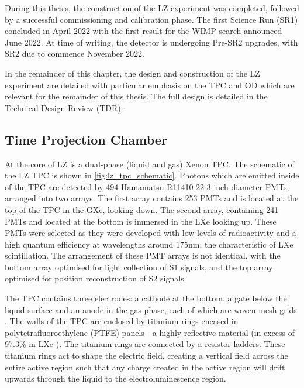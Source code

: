 \par
During this thesis, the construction of the LZ experiment was completed, followed by a successful commissioning and calibration phase.
The first Science Run (SR1) concluded in April 2022 with the first result for the WIMP search announced June 2022.
At time of writing, the detector is undergoing Pre-SR2 upgrades, with SR2 due to commence November 2022.

\par
In the remainder of this chapter, the design and construction of the LZ experiment are detailed with particular emphasis on the TPC and OD which are relevant for the remainder of this thesis. 
The full design is detailed in the Technical Design Review (TDR) \cite{LZ_TechnicalDesignReview_ref}.

\subsection{Time Projection Chamber}
\label{sec:lz_tpc}
\par
At the core of LZ is a dual-phase (liquid and gas) Xenon TPC.
The schematic of the LZ TPC is shown in \autoref{fig:lz_tpc_schematic}.
Photons which are emitted inside of the TPC are detected by 494 Hamamatsu R11410-22 3-inch diameter PMTs, arranged into two arrays.
The first array contains 253 PMTs and is located at the top of the TPC in the GXe, looking down.
The second array, containing 241 PMTs and located at the bottom is immersed in the LXe looking up.
These PMTs were selected as they were developed with low levels of radioactivity and a high quantum efficiency at wavelengths around 175nm, the characteristic of LXe scintillation.
The arrangement of these PMT arrays is not identical, with the bottom array optimised for light collection of S1 signals, and the top array optimised for position reconstruction of S2 signals.
\par
The TPC contains three electrodes: a cathode at the bottom, a gate below the liquid surface and an anode in the gas phase, each of which are woven mesh grids \cite{lz_grids_ref}.
The walls of the TPC are enclosed by titanium rings encased in polytetrafluoroethylene (PTFE) panels - a highly reflective material (in excess of 97.3\% in LXe \cite{ptfe_lxe_reflectivity_ref}).
The titanium rings are connected by a resistor ladders.
These titanium rings act to shape the electric field, creating a vertical field across the entire active region such that any charge created in the active region will drift upwards through the liquid to the electroluminescence region.
